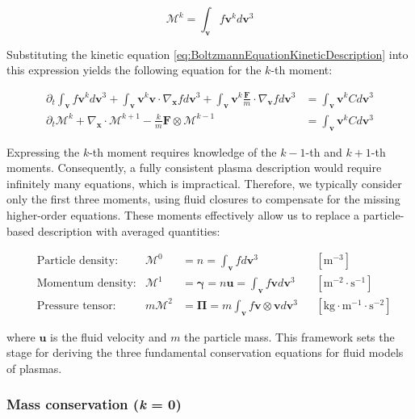 \begin{equation}
	\mathcal{M}^k = \int_\mathbf{v} f\mathbf{v}^k d\mathbf{v}^3
\end{equation}

Substituting the kinetic equation \ref{eq:BoltzmannEquationKineticDescription} into this expression yields the following equation for the $k$-th moment:

\begin{align}
	\partial_t \int_\mathbf{v} f\mathbf{v}^k d\mathbf{v}^3 + \int_\mathbf{v} \mathbf{v}^k \mathbf{v} \cdot \nabla_{\mathbf{x}} f d\mathbf{v}^3 + \int_\mathbf{v} \mathbf{v}^k \frac{\mathbf{F}}{m} \cdot \nabla_{\mathbf{v}} f d\mathbf{v}^3 &= \int_\mathbf{v} \mathbf{v}^k C d\mathbf{v}^3 \nonumber \\
	\partial_t \mathcal{M}^k + \nabla_{\mathbf{x}} \cdot \mathcal{M}^{k+1} - \frac{k}{m} \mathbf{F} \otimes \mathcal{M}^{k-1} &= \int_\mathbf{v} \mathbf{v}^k C d\mathbf{v}^3 \label{eq:desc_generalMomentsEq}
\end{align}

Expressing the $k$-th moment requires knowledge of the $k-1$-th and $k+1$-th moments. Consequently, a fully consistent plasma description would require infinitely many equations, which is impractical. Therefore, we typically consider only the first three moments, using fluid closures to compensate for the missing higher-order equations. These moments effectively allow us to replace a particle-based description with averaged quantities:

\begin{align}
	&\text{Particle density:} & \mathcal{M}^0 &= n = \int_\mathbf{v} f d\mathbf{v}^3 && \left[\text{m}^{-3}\right] \\
	&\text{Momentum density:} & \mathcal{M}^1 &= \boldsymbol{\gamma}  = n \mathbf{u} = \int_\mathbf{v} f \mathbf{v} d\mathbf{v}^3 && \left[\text{m}^{-2} \cdot \text{s}^{-1}\right] \\
	&\text{Pressure tensor:}   &  m \mathcal{M}^2 &= \boldsymbol{\Pi} = m \int_\mathbf{v} f \mathbf{v} \otimes \mathbf{v} d\mathbf{v}^3 && \left[\text{kg} \cdot \text{m}^{-1} \cdot \text{s}^{-2}\right]
\end{align}

where $\mathbf{u}$ is the fluid velocity and $m$ the particle mass. This framework sets the stage for deriving the three fundamental conservation equations for fluid models of plasmas.



\subsubsection{Mass conservation (\textit{k} = 0)}


